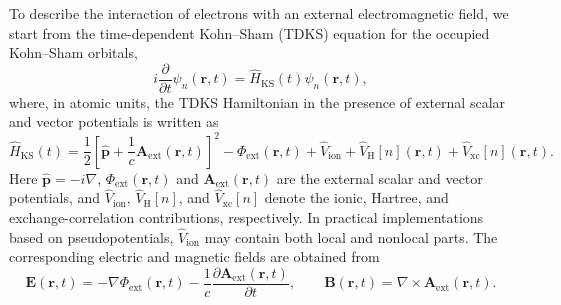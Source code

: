 To describe the interaction of electrons with an external electromagnetic field, we start from the time-dependent Kohn--Sham (TDKS) equation for the occupied Kohn--Sham orbitals,
\begin{equation}
i\frac{\partial}{\partial t}\psi_{n}(\mathbf r,t) = \hat H_{\mathrm{KS}}(t)\psi_{n}(\mathbf r,t),
\label{eq:tdks_general}
\end{equation}
where, in atomic units, the TDKS Hamiltonian in the presence of external scalar and vector potentials is written as
\begin{equation}
\hat H_{\mathrm{KS}}(t) = \frac{1}{2} \left[ \hat{\mathbf p} + \frac{1}{c}\mathbf A_{\mathrm{ext}}(\mathbf r,t) \right]^2
                       - \Phi_{\mathrm{ext}}(\mathbf r,t) + \hat V_{\mathrm{ion}} + \hat V_{\mathrm{H}}[n](\mathbf r,t) + \hat V_{\mathrm{xc}}[n](\mathbf r,t).
\label{eq:tdks_minimal_coupling}
\end{equation}
Here \(\hat{\mathbf p}=-i\nabla\), \(\Phi_{\mathrm{ext}}(\mathbf r,t)\) and \(\mathbf A_{\mathrm{ext}}(\mathbf r,t)\) are the external scalar and vector potentials, and \(\hat V_{\mathrm{ion}}\), \(\hat V_{\mathrm{H}}[n]\), and \(\hat V_{\mathrm{xc}}[n]\) denote the ionic, Hartree, and exchange-correlation contributions, respectively. In practical implementations based on pseudopotentials, \(\hat V_{\mathrm{ion}}\) may contain both local and nonlocal parts. The corresponding electric and magnetic fields are obtained from
\begin{equation}
\mathbf E(\mathbf r,t)
=
-\nabla \Phi_{\mathrm{ext}}(\mathbf r,t)
-
\frac{1}{c}\frac{\partial \mathbf A_{\mathrm{ext}}(\mathbf r,t)}{\partial t},
\qquad
\mathbf B(\mathbf r,t)
=
\nabla \times \mathbf A_{\mathrm{ext}}(\mathbf r,t).
\label{eq:em_fields_from_potentials}
\end{equation}

